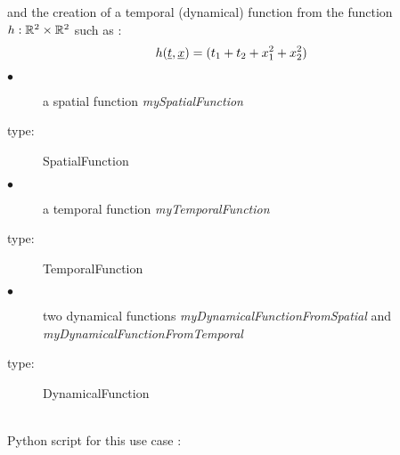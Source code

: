 and the creation  of a temporal (dynamical) function from the function $h:{\mathbb R}^2\times{\mathbb R}^2$ such as :
\begin{align}
  h({\underline{t}}, {\underline{x}})=(t_1+t_2+x_1^2+x_2^2)
\end{align}

             {
               \begin{description}
               \item[$\bullet$] a spatial function {\itshape mySpatialFunction}
               \item[type:] SpatialFunction
               \item[$\bullet$] a temporal function {\itshape myTemporalFunction}
               \item[type:] TemporalFunction
               \item[$\bullet$] two dynamical functions {\itshape myDynamicalFunctionFromSpatial} and {\itshape myDynamicalFunctionFromTemporal}
               \item[type:] DynamicalFunction
               \end{description}

             }

             \textspace\\
             Python script for this use case :

